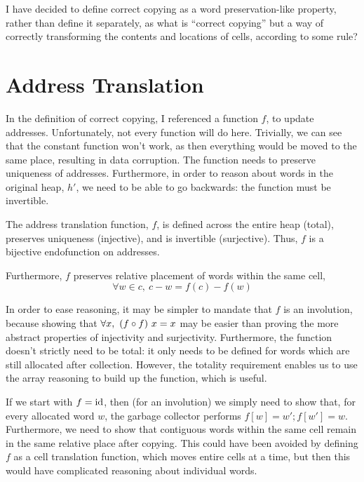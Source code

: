 I have decided to define correct copying as a word preservation-like
property, rather than define it separately, as what is ``correct
copying'' but a way of correctly transforming the contents and
locations of \glspl{cell}, according to some rule?

\section{Address Translation}
\label{sec:copying-address}

In the definition of correct \gls{copying}, I referenced a function
$f$, to update addresses. Unfortunately, not every function will do
here. Trivially, we can see that the constant function won't work, as
then everything would be moved to the same place, resulting in data
corruption. The function needs to preserve uniqueness of
addresses. Furthermore, in order to reason about words in the original
\gls{heap}, $h'$, we need to be able to go backwards: the function
must be invertible.

\begin{definition}
  \label{def:c-address-translation-function}
  The address translation function, $f$, is defined across the entire
  heap (total), preserves uniqueness (injective), and is invertible
  (surjective). Thus, $f$ is a bijective endofunction on addresses.

  Furthermore, $f$ preserves relative placement of words within the
  same cell, \[\forall w \in c,\ c - w = f(c) - f(w)\]
\end{definition}

In order to ease reasoning, it may be simpler to mandate that $f$ is
an involution, because showing that $\forall x,\ (f \circ f)~x = x$ may
be easier than proving the more abstract properties of injectivity and
surjectivity. Furthermore, the function doesn't strictly need to be
total: it only needs to be defined for words which are still allocated
after collection. However, the totality requirement enables us to use
the array reasoning to build up the function, which is useful.

If we start with $f = \mathrm{id}$, then (for an involution) we simply need to
show that, for every allocated word $w$, the \gls{garbage collector}
performs $f[w] = w'; f[w'] = w$. Furthermore, we need to show that
contiguous words within the same \gls{cell} remain in the same
relative place after copying. This could have been avoided by defining
$f$ as a cell translation function, which moves entire cells at a
time, but then this would have complicated reasoning about individual
words.

